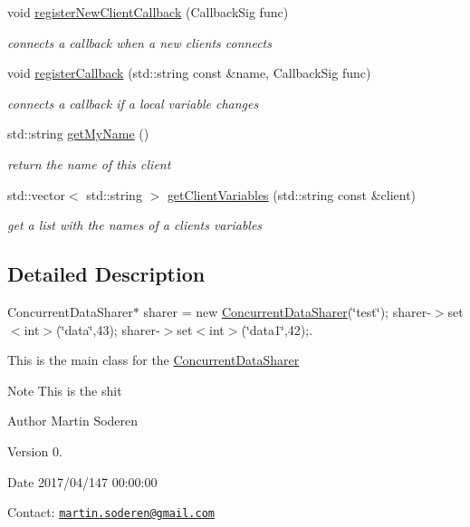 \begin{DoxyCompactItemize}
void \hyperlink{classConcurrentDataSharer_af49ca1b3094d8e5991032aff3e26a39a}{register\+New\+Client\+Callback} (Callback\+Sig func)
\begin{DoxyCompactList}\small\item\em connects a callback when a new clients connects \end{DoxyCompactList}\item 
void \hyperlink{classConcurrentDataSharer_ab1f7d71cb857152ae4c9f5559a3ad32e}{register\+Callback} (std\+::string const \&name, Callback\+Sig func)
\begin{DoxyCompactList}\small\item\em connects a callback if a local variable changes \end{DoxyCompactList}\item 
std\+::string \hyperlink{classConcurrentDataSharer_a7bdc1d74f0d94a9855121f0ddb496bde}{get\+My\+Name} ()
\begin{DoxyCompactList}\small\item\em return the name of this client \end{DoxyCompactList}\item 
std\+::vector$<$ std\+::string $>$ \hyperlink{classConcurrentDataSharer_aba0ce899cc2994d381ab59fb359b8a25}{get\+Client\+Variables} (std\+::string const \&client)
\begin{DoxyCompactList}\small\item\em get a list with the names of a clients variables \end{DoxyCompactList}\end{DoxyCompactItemize}


\subsection{Detailed Description}
Concurrent\+Data\+Sharer$\ast$ sharer = new \hyperlink{classConcurrentDataSharer}{Concurrent\+Data\+Sharer}(\char`\"{}test\char`\"{}); sharer-\/$>$set$<$int$>$(\char`\"{}data\char`\"{},43); sharer-\/$>$set$<$int$>$(\char`\"{}data1\char`\"{},42);. 

This is the main class for the \hyperlink{classConcurrentDataSharer}{Concurrent\+Data\+Sharer}

\begin{DoxyNote}{Note}
This is the shit
\end{DoxyNote}
\begin{DoxyAuthor}{Author}
Martin Soderen
\end{DoxyAuthor}
\begin{DoxyVersion}{Version}
0.
\end{DoxyVersion}
\begin{DoxyDate}{Date}
2017/04/147 00\+:00\+:00
\end{DoxyDate}
Contact\+: \href{mailto:martin.soderen@gmail.com}{\tt martin.\+soderen@gmail.\+com}

